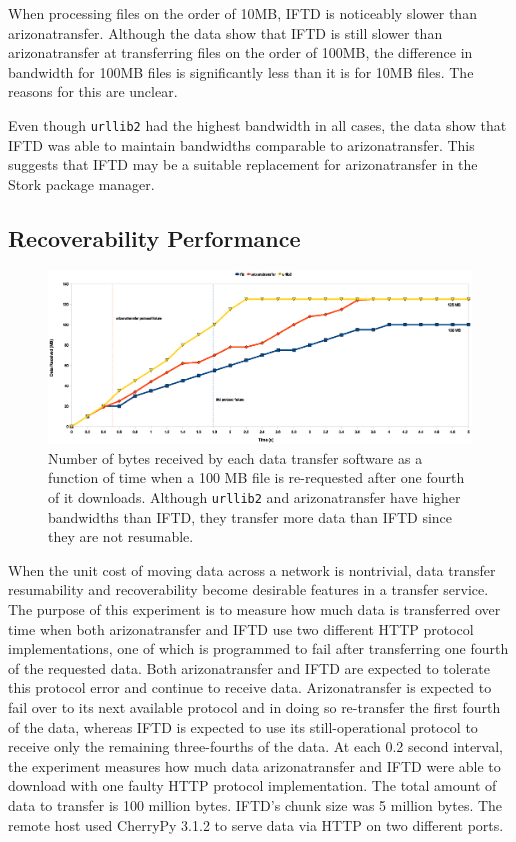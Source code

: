 When processing files on the order of 10MB, IFTD is noticeably slower than arizonatransfer.  Although the data show that IFTD is still slower than arizonatransfer at transferring files on the order of 100MB, the difference in bandwidth for 100MB files is significantly less than it is for 10MB files.  The reasons for this are unclear.

Even though \texttt{urllib2} had the highest bandwidth in all cases, the data show that IFTD was able to maintain bandwidths comparable to arizonatransfer.  This suggests that IFTD may be a suitable replacement for arizonatransfer in the Stork package manager.


\subsection{Recoverability Performance}

\begin{figure}[h!]
    \centering
    \includegraphics[width=1.0\textwidth]{diagrams/recoverability-performance}
    \caption{Number of bytes received by each data transfer software as a function of time when a 100 MB file is re-requested after one fourth of it downloads.  Although \texttt{urllib2} and arizonatransfer have higher bandwidths than IFTD, they transfer more data than IFTD since they are not resumable.}
    \label{recoverability-performance}
\end{figure}

When the unit cost of moving data across a network is nontrivial, data transfer resumability and recoverability become desirable features in a transfer service.  The purpose of this experiment is to measure how much data is transferred over time when both arizonatransfer and IFTD use two different HTTP protocol implementations, one of which is programmed to fail after transferring one fourth of the requested data.  Both arizonatransfer and IFTD are expected to tolerate this protocol error and continue to receive data.  Arizonatransfer is expected to fail over to its next available protocol and in doing so re-transfer the first fourth of the data, whereas IFTD is expected to use its still-operational protocol to receive only the remaining three-fourths of the data.  At each 0.2 second interval, the experiment measures how much data arizonatransfer and IFTD were able to download with one faulty HTTP protocol implementation.  The total amount of data to transfer is 100 million bytes.  IFTD's chunk size was 5 million bytes.  The remote host used CherryPy 3.1.2 to serve data via HTTP on two different ports.

